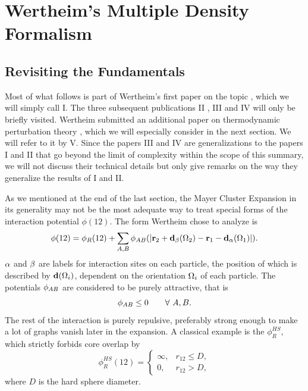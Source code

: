 \documentclass[8.5pt,twoside,twocolumn]{article}
\renewcommand\r{\bo r}
\newcommand\pab{\enmat{\phi_{AB}}}
\theoremstyle{standard}
\begin{document}
\section{Wertheim's Multiple Density Formalism}
\label{WH}
\subsection{Revisiting the Fundamentals}
\label{WH:RevFunda}
Most of what follows is part of Wertheim's first paper on the topic \cite{Wertheim1}, which we will simply call I.
The three subsequent publications II \cite{Wertheim2}, III \cite{Wertheim3} and IV \cite{Wertheim4} will only
be briefly visited. Wertheim submitted an additional paper on thermodynamic perturbation theory \cite{WertheimTPT},
which we will especially consider in the next section. We will refer to it by V. Since the papers III and IV are
generalizations to the papers I and II that go beyond the limit of complexity within the scope of this summary,
we will not discuss their technical details but only give remarks on the way they generalize the results of I and II.

As we mentioned at the end of the last section, the Mayer Cluster Expansion in its generality may not be
the most adequate way to treat special forms of the interaction potential $\phi(12)$. The form Wertheim
chose to analyze is
\begin{equation}
\phi(12)=\phi_R(12)+\sum_{A,B} \phi_{AB}(\abs{\r_2+\bo d_\be(\Om_2)-\r_1-\bo d_\al(\Om_1)}).
\label{WH:phi12}
\end{equation}  
$\alpha$ and $\beta$ are labels for interaction sites on each particle, the position of which is described
by $\mathbf{d}(\Omega_i)$, dependent on the orientation $\Omega_i$ of each particle. The potentials $\pab$ are
considered to be purely attractive, that is
\begin{equation}
\pab \le 0 \qquad \forall\ A, B.
\label{WH:pabAttractive}
\end{equation} 
The rest of the interaction is purely repulsive, preferably strong enough to make a lot of
graphs vanish later in the expansion. A classical example is the 
$\phi_R^{HS}$, which strictly forbids core overlap by
\begin{equation}
\phi_R^{HS}(12)=\begin{cases}
\infty, &r_{12} \le D, \\
0, &r_{12} > D, 
\end{cases}
\label{WH:HS}
\end{equation}
where $D$ is the hard sphere diameter.
\end{document}
